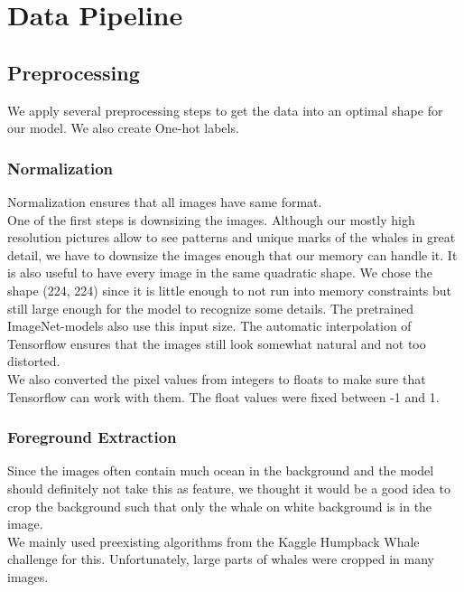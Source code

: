 \section{Data Pipeline}
\label{sec:data-pipeline}

\subsection{Preprocessing}
We apply several preprocessing steps to get the data into an optimal shape for our model. We also create One-hot labels.

\subsubsection{Normalization}
Normalization ensures that all images have same format.\\
One of the first steps is downsizing the images. Although our mostly high resolution pictures allow to see patterns and unique marks of the whales in great detail, we have to downsize the images enough that our memory can handle it. It is also useful to have every image in the same quadratic shape. We chose the shape (224, 224) since it is little enough to not run into memory constraints but still large enough for the model to recognize some details. The pretrained ImageNet-models also use this input size. The automatic interpolation of Tensorflow ensures that the images still look somewhat natural and not too distorted. \\
We also converted the pixel values from integers to floats to make sure that Tensorflow can work with them. The float values were fixed between -1 and 1.

\subsubsection{Foreground Extraction}
Since the images often contain much ocean in the background and the model should definitely not take this as feature, we thought it would be a good idea to crop the background such that only the whale on white background is in the image.\\
We mainly used preexisting algorithms from the Kaggle Humpback Whale challenge \cite{kapse} for this. Unfortunately, large parts of whales were cropped in many images. \\

